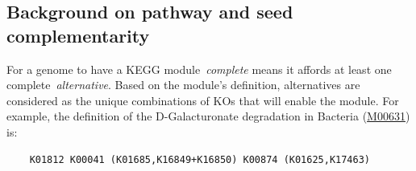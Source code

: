 \documentclass[sn-mathphys,Numbered]{sn-jnl}  %
\theoremstyle{thmstyleone}%
\theoremstyle{thmstyletwo}%
\theoremstyle{thmstylethree}%
\begin{document}
\begin{appendices}













    \section{Background on pathway and seed complementarity}
    \label{app:pathcompl}

        For a genome to have a KEGG module~\textit{complete} means it affords at least one complete~\textit{alternative}.
        Based on the module's definition, alternatives are considered as the unique combinations of KOs that will enable the module.
        For example, the definition of the D-Galacturonate degradation in Bacteria (\href{https://www.genome.jp/dbget-bin/www_bget?M00631}{M00631}) is:
        \bigskip
        \begin{verbatim}    K01812 K00041 (K01685,K16849+K16850) K00874 (K01625,K17463)\end{verbatim}
        \bigskip
        

\end{appendices}
\end{document}
